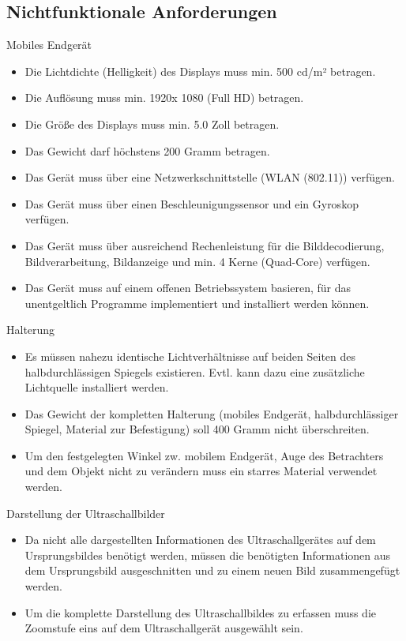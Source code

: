 \subsection{Nichtfunktionale Anforderungen} \label{NichtFunkAnf}
\begin{minipage}{\textwidth}
Mobiles Endgerät
\begin{itemize}
\item Die Lichtdichte (Helligkeit) des Displays muss min. 500 cd/m² betragen.
\item Die Auflösung muss min. 1920x 1080 (Full HD) betragen.
\item Die Größe des Displays muss min. 5.0 Zoll betragen.
\item Das Gewicht darf höchstens 200 Gramm betragen.
\item Das Gerät muss über eine Netzwerkschnittstelle (WLAN (802.11)) verfügen.
\item Das Gerät muss über einen Beschleunigungssensor und ein Gyroskop verfügen.
\item Das Gerät muss über ausreichend Rechenleistung für die Bilddecodierung, Bildverarbeitung, Bildanzeige und min. 4 Kerne (Quad-Core) verfügen.
\item Das Gerät muss auf einem offenen Betriebssystem basieren, für das unentgeltlich Programme implementiert und installiert werden können.
\end{itemize}
\end{minipage}

\begin{minipage}{\textwidth}
Halterung
\begin{itemize}
\item Es müssen nahezu identische Lichtverhältnisse auf beiden Seiten des halbdurchlässigen Spiegels existieren. Evtl. kann dazu eine zusätzliche Lichtquelle installiert werden.
\item Das Gewicht der kompletten Halterung (mobiles Endgerät, halbdurchlässiger Spiegel, Material zur Befestigung)  soll 400 Gramm nicht überschreiten.
\item Um den festgelegten Winkel zw. mobilem Endgerät, Auge des Betrachters und dem Objekt nicht zu verändern muss ein starres Material verwendet werden.
\end{itemize}
\end{minipage}

\begin{minipage}{\textwidth}
Darstellung der Ultraschallbilder
\begin{itemize}
\item Da nicht alle dargestellten Informationen des Ultraschallgerätes auf dem Ursprungsbildes benötigt werden, müssen die benötigten Informationen aus dem Ursprungsbild ausgeschnitten und zu einem neuen Bild zusammengefügt werden.
\item Um die komplette Darstellung des Ultraschallbildes zu erfassen muss die Zoomstufe eins auf dem Ultraschallgerät ausgewählt sein.
\end{itemize}
\end{minipage}
